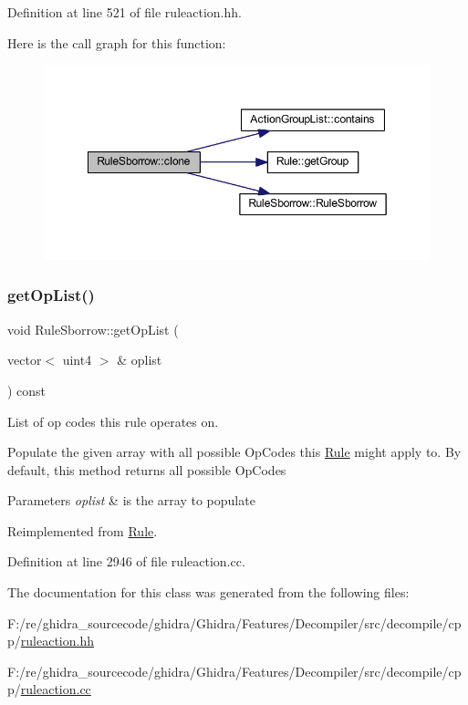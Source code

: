 Definition at line 521 of file ruleaction.\+hh.

Here is the call graph for this function\+:
\nopagebreak
\begin{figure}[H]
\begin{center}
\leavevmode
\includegraphics[width=349pt]{class_rule_sborrow_a25117849635c9e96434c3a054129d18b_cgraph}
\end{center}
\end{figure}
\mbox{\label{class_rule_sborrow_a8ba2b2878ddae189783562e0225656a4}} 
\subsubsection{\texorpdfstring{getOpList()}{getOpList()}}
{\footnotesize\ttfamily void Rule\+Sborrow\+::get\+Op\+List (\begin{DoxyParamCaption}\item[{vector$<$ uint4 $>$ \&}]{oplist }\end{DoxyParamCaption}) const\hspace{0.3cm}{\ttfamily [virtual]}}



List of op codes this rule operates on. 

Populate the given array with all possible Op\+Codes this \mbox{\hyperlink{class_rule}{Rule}} might apply to. By default, this method returns all possible Op\+Codes 
\begin{DoxyParams}{Parameters}
{\em oplist} & is the array to populate \\
\hline
\end{DoxyParams}


Reimplemented from \mbox{\hyperlink{class_rule_a4023bfc7825de0ab866790551856d10e}{Rule}}.



Definition at line 2946 of file ruleaction.\+cc.



The documentation for this class was generated from the following files\+:\begin{DoxyCompactItemize}
\item 
F\+:/re/ghidra\+\_\+sourcecode/ghidra/\+Ghidra/\+Features/\+Decompiler/src/decompile/cpp/\mbox{\hyperlink{ruleaction_8hh}{ruleaction.\+hh}}\item 
F\+:/re/ghidra\+\_\+sourcecode/ghidra/\+Ghidra/\+Features/\+Decompiler/src/decompile/cpp/\mbox{\hyperlink{ruleaction_8cc}{ruleaction.\+cc}}\end{DoxyCompactItemize}

